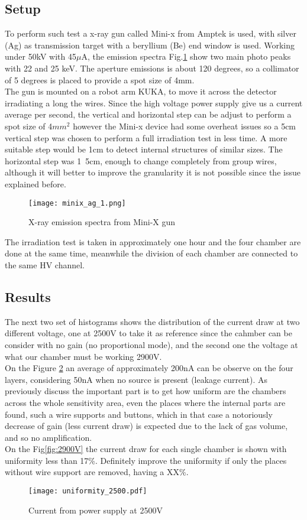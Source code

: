 \subsection{Setup}
To perform such test a x-ray gun called Mini-x from Amptek is used, with silver (Ag) as transmission target with a beryllium (Be) end window is used.
Working under \unit{50}{kV} with \unit{45}{$\mu$A}, the emission spectra Fig.\ref{fig:minixgun} show two main photo peaks with 22 and 25 keV. The
aperture emissions is about 120 degrees, so a collimator of 5 degrees is placed to provide a spot size of \unit{4}{mm}.\\ The gun is mounted on a
robot arm KUKA, to move it across the detector irradiating a long the wires. Since the high voltage power supply give us a current average per
second, the vertical and horizontal step can be adjust to perform a spot size of 4$mm^2$ however the Mini-x device had some overheat issues so a
\unit{5}{cm} vertical step was chosen to perform a full irradiation test in less time. A more suitable step would be \unit{1}{cm} to detect
internal structures of similar sizes. The horizontal step was \unit{1.5}{cm}, enough to change completely from group wires, although it will better
to improve the granularity it is not possible since the issue explained before.
\begin{figure}[ht]
	\centering
	\texttt{[image: minix\_ag\_1.png]}
	\caption{X-ray emission spectra from Mini-X gun}\label{fig:minixgun}
\end{figure}

The irradiation test is taken in approximately one hour and the four chamber are done at the same time, meanwhile the division of each chamber are
connected to the same HV channel. 
\subsection{Results}
The next two set of histograms shows the distribution of the current draw at two different voltage, one at 2500V to take it as  reference since the cahmber can
be consider with no gain (no proportional mode), and the second one the voltage at what our chamber must be working 2900V.\\
On the Figure \ref{fig:2500V} an average of approximately \unit{200}{nA} can be observe on the four layers, considering \unit{50}{nA} when no source is present
(leakage current).
As previously discuss the important part is to get how uniform are the chambers across the whole sensitivity area, even the places where the internal parts are
found, such a wire supports and buttons, which in that case a notoriously decrease of gain (less current draw) is expected due to the lack of gas volume, and so
no amplification.\\
On the Fig\ref{fig:2900V} the current draw for each single chamber is shown with uniformity less than 17\%. Definitely improve the uniformity if only the places without wire
support are removed, having a XX\%.
\begin{figure}[hb]
	\centering
	\texttt{[image: uniformity\_2500.pdf]}
	\caption{Current from power supply at 2500V}\label{fig:2500V}
\end{figure}

